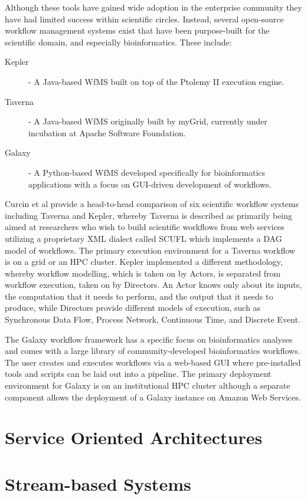 Although these tools have gained wide adoption in the enterprise community they have had limited success within scientific circles. Instead, several open-source workflow management systems exist that have been purpose-built for the scientific domain, and especially bioinformatics. These include:

\begin{description}
\item[Kepler\autocite{ludascher2006scientific}] - A Java-based WfMS built on top of the Ptolemy II\autocite{davis1999overview} execution engine.
\item[Taverna\autocite{oinn2004taverna}] - A Java-based WfMS originally built by myGrid, currently under incubation at Apache Software Foundation. 
\item[Galaxy\autocite{goecks2010galaxy}] - A Python-based WfMS developed specifically for bioinformatics applications with a focus on GUI-driven development of workflows.
\end{description}

Curcin et al\autocite{curcin2008scientific} provide a head-to-head comparison of six scientific workflow systems including Taverna and Kepler, whereby Taverna is described as primarily being aimed at researchers who wish to build scientific workflows from web services utilizing a proprietary XML dialect called SCUFL which implements a DAG model of workflows. The primary execution environment for a Taverna workflow is on a grid or an HPC cluster. Kepler implemented a different methodology, whereby workflow modelling, which is taken on by Actors, is separated from workflow execution, taken on by Directors. An Actor knows only about its inputs, the computation that it needs to perform, and the output that it needs to produce, while Directors provide different models of execution, such as Synchronous Data Flow, Process Network, Continuous Time, and Discrete Event.

The Galaxy workflow framework has a specific focus on bioinformatics analyses and comes with a large library of community-developed bioinformatics workflows. The user creates and executes workflows via a web-based GUI where pre-installed tools and scripts can be laid out into a pipeline. The primary deployment environment for Galaxy is on an institutional HPC cluster although a separate component allows the deployment of a Galaxy instance on Amazon Web Services\autocite{afgan2010galaxy}.

\section{Service Oriented Architectures}

\section{Stream-based Systems}


